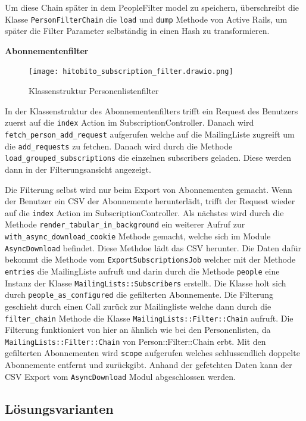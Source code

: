 Um diese Chain später in dem PeopleFilter model zu speichern, überschreibt die Klasse \texttt{Person\:\:Filter\:\:Chain} die \texttt{load} und \texttt{dump} Methode
von Active Rails, um später die Filter Parameter selbständig in einen Hash zu transformieren.

\newpage

\textbf{Abonnementenfilter}
\begin{figure}[h]
   \centering
   \texttt{[image: hitobito\_subscription\_filter.drawio.png]}
   \caption{Klassenstruktur Personenlistenfilter}
\end{figure}

In der Klassenstruktur des Abonnementenfilters trifft ein Request des Benutzers zuerst auf die \texttt{index} Action im SubscriptionController. 
Danach wird \texttt{fetch\_person\_add\_request} aufgerufen welche auf die MailingListe zugreift um die \texttt{add\_requests} zu fetchen. Danach wird durch
die Methode \texttt{load\_grouped\_subscriptions} die einzelnen subscribers geladen. Diese werden dann in der Filterungsansicht angezeigt. 

Die Filterung selbst wird nur beim Export von Abonnementen gemacht. Wenn der Benutzer ein CSV der Abonnemente herunterlädt, trifft der Request wieder auf die
\texttt{index} Action im SubscriptionController. Als nächstes wird durch die Methode \texttt{render\_tabular\_in\_background} ein weiterer Aufruf zur 
\texttt{with\_async\_download\_cookie} Methode gemacht, welche sich im Module \texttt{AsyncDownload} befindet. Diese Methdoe lädt das CSV herunter. 
Die Daten dafür bekommt die Methode vom \texttt{Export\:\:SubscriptionsJob} welcher mit der Methode \texttt{entries} die MailingListe aufruft und 
darin durch die Methode \texttt{people} eine Instanz der Klasse \texttt{MailingLists::Subscribers} erstellt. Die Klasse 
holt sich durch \texttt{people\_as\_configured} die gefilterten Abonnemente. Die Filterung geschieht durch einen Call zurück zur Mailingliste welche
dann durch die \texttt{filter\_chain} Methode die Klasse \texttt{MailingLists::Filter::Chain} aufruft. Die Filterung funktioniert von hier an ähnlich wie
bei den Personenlisten, da \texttt{MailingLists::Filter::Chain} von {Person::Filter::Chain} erbt. Mit den gefilterten Abonnementen wird \texttt{scope} aufgerufen
welches schlussendlich doppelte Abonnemente entfernt und zurückgibt. Anhand der gefetchten Daten kann der CSV Export vom \texttt{AsyncDownload} Modul abgeschlossen werden.

\subsection{Lösungsvarianten}
